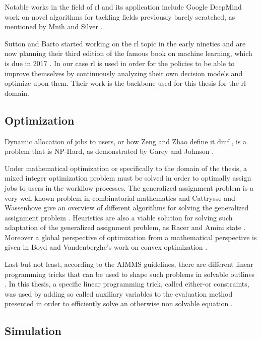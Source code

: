 \documentclass{seal_thesis}
\begin{document}
Notable works in the field of \gls{rl} and its application include Google DeepMind work on novel algorithms for tackling fields previously barely scratched, as mentioned by Mnih \etal and Silver \etal \cite{Mnih2015,Silver2016}.

Sutton and Barto started working on the \gls{rl} topic in the early nineties and are now planning their third edition of the famous book on machine learning, which is due in 2017 \cite{Sutton2017}. In our case \gls{rl} is used in order for the policies to be able to improve themselves by continuously analyzing their own decision models and optimize upon them. Their work is the backbone used for this thesis for the \gls{rl} domain.

\subsection{Optimization}

Dynamic allocation of jobs to users, or how Zeng and Zhao define it \ie \gls{dmf} \cite{Zeng2005}, is a problem that is NP-Hard, as demonstrated by Garey and Johnson \cite{Garey1990}.

Under mathematical optimization or specifically to the domain of the thesis, a mixed integer optimization problem must be solved in order to optimally assign jobs to users in the workflow processes. The generalized assignment problem is a very well known problem in combinatorial mathematics and Cattrysse and Wassenhove give an overview of different algorithms for solving the generalized assignment problem \cite{Cattrysse1992}. Heuristics are also a viable solution for solving such adaptation of the generalized assignment problem, as Racer and Amini state \cite{Racer1994}. Moreover a global perspective of optimization from a mathematical perspective is given in Boyd and Vandenberghe's work on convex optimization \cite{Boyd2004}.

Last but not least, according to the AIMMS guidelines, there are different linear programming tricks that can be used to shape such problems in solvable outlines \cite{Bisschop2016}. In this thesis, a specific linear programming trick, called either-or constraints, was used by adding so called auxiliary variables to the evaluation method presented in order to efficiently solve an otherwise non solvable equation \cite[p. 77]{Bisschop2016}.

\subsection{Simulation}
\end{document}
